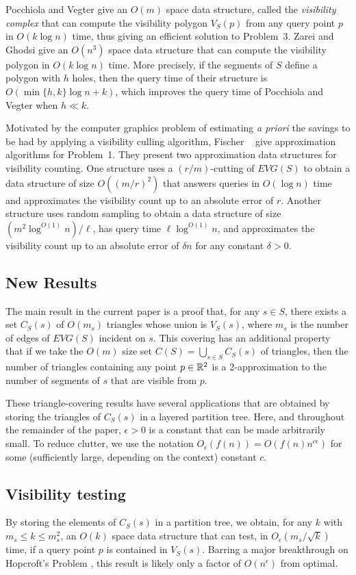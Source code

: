 \documentclass{patmorin}
\newcommand{\EVG}{\mathit{EVG}}
\newcommand{\Oe}{O_\epsilon}
\begin{document}
Pocchiola and Vegter \cite{pvXX} give an $O(m)$ space data structure,
called the \emph{visibility complex} that can compute the visibility
polygon $V_S(p)$ from any query point $p$ in $O(k \log n)$ time,
thus giving an efficient solution to Problem~3.  Zarei and Ghodsi
give an $O(n^3)$ space data structure that can compute the visibility
polygon in $O(k \log n)$ time.  More precisely, if the segments of $S$
define a polygon with $h$ holes, then the query time of their structure is
$O(\min\{h,k\}\log n + k)$, which improves the query time of Pocchiola
and Vegter when $h \ll k$.

Motivated by the computer graphics problem of estimating \emph{a priori}
the savings to be had by applying a visibility culling algorithm, Fischer
\etal\ \cite{fXX} give approximation algorithms for Problem~1.  They
present two approximation data structures for visibility counting. One
structure uses a $(r/m)$-cutting \cite{X} of $\EVG(S)$ to obtain a data
structure of size $O((m/r)^2)$ that answers queries in $O(\log n)$ time
and approximates the visibility count up to an absolute error of $r$.
Another structure uses random sampling to obtain a data structure of
size $(m^2\log^{O(1)} n)/\ell$, has query time $\ell\log^{O(1)} n$, and
approximates the visibility count up to an absolute error of $\delta n$
for any constant $\delta > 0$.

\subsection{New Results}

The main result in the current paper is a proof that, for any $s\in S$,
there exists a set $C_S(s)$ of $O(m_s)$ triangles whose union is $V_S(s)$,
where $m_s$ is the number of edges of $\EVG(S)$ incident on $s$.  This
covering has an additional property that if we take the $O(m)$ size set
$C(S)=\bigcup_{s\in S}C_S(s)$ of triangles, then the number of triangles
containing any point $p\in\mathbb{R}^2$ is a 2-approximation to the number of
segments of $s$ that are visible from $p$.

These triangle-covering results have several applications that are
obtained by storing the triangles of $C_S(s)$ in a layered partition
tree.   Here, and throughout the remainder of the paper, $\epsilon >
0$ is a constant that can be made arbitrarily small. To reduce clutter,
we use the notation $\Oe(f(n))=O(f(n)n^{c\epsilon})$ for some (sufficiently
large, depending on the context) constant $c$.

\subsection{Visibility testing} 
By storing the elements of $C_S(s)$ in a partition tree, we obtain,
for any $k$ with $m_s\le k\le m_s^2$, an $O(k)$ space data structure
that can test, in $\Oe(m_s/\sqrt{k})$ time, if a query point $p$ is
contained in $V_S(s)$.  Barring a major breakthrough on Hopcroft's Problem
\cite{hXX,eXX}, this result is likely only a factor of $O(n^\epsilon)$
from optimal.
\end{document}
